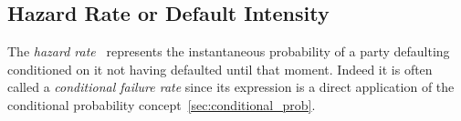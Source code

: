 \subsection{Hazard Rate or Default Intensity}
\label{hazard-rate}

The \emph{hazard rate}~\cite{bib:hazard} represents the instantaneous probability of a party defaulting conditioned on it not having defaulted until that moment. Indeed it is often called a \emph{conditional failure rate} since its expression is a direct application of the conditional probability concept~\ref{sec:conditional_prob}.


